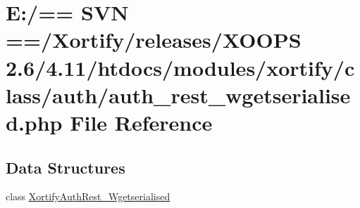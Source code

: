 \hypertarget{auth__rest__wgetserialised_8php}{\section{E\-:/== S\-V\-N ==/\-Xortify/releases/\-X\-O\-O\-P\-S 2.6/4.11/htdocs/modules/xortify/class/auth/auth\-\_\-rest\-\_\-wgetserialised.php File Reference}
\label{auth__rest__wgetserialised_8php}
}
\subsection*{Data Structures}
\begin{DoxyCompactItemize}
\item 
class \hyperlink{class_xortify_auth_rest___wgetserialised}{Xortify\-Auth\-Rest\-\_\-\-Wgetserialised}
\end{DoxyCompactItemize}
